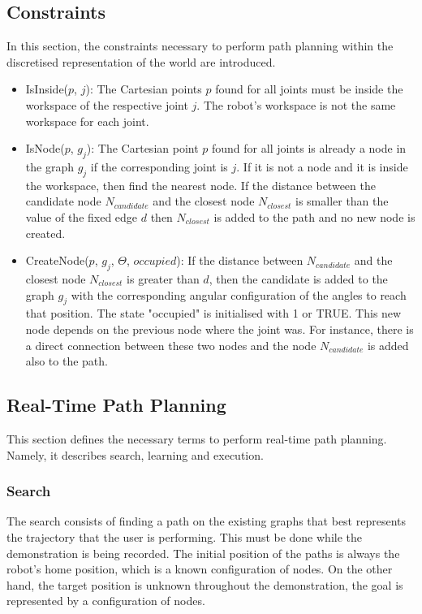 \documentclass[thesis]{mas_proposal}
\begin{document}
\subsection{Constraints}
	In this section, the constraints necessary to perform path planning within the discretised representation of the world are introduced.
	\begin{itemize}
		\item IsInside($p$, $j$): The Cartesian points $p$ found for all joints must be inside the workspace of the respective joint $j$. The robot's workspace is not the same workspace for each joint.
		\item IsNode($p$, $g_j$): The Cartesian point $p$ found for all joints is already a node in the graph $g_j$ if the corresponding joint is $j$. If it is not a node and it is inside the workspace, then find the nearest node. If the distance between the candidate node $N_{candidate}$ and the closest node $N_{closest}$ is smaller than the value of the fixed edge $d$ then $N_{closest}$ is added to the path and no new node is created.
		\item CreateNode($p$, $g_j$, $\Theta$, $occupied$): If the distance between $N_{candidate}$ and the closest node $N_{closest}$ is greater than $d$, then the candidate is added to the graph $g_j$ with the corresponding angular configuration of the angles to reach that position. The state "occupied" is initialised with 1 or TRUE. This new node depends on the previous node where the joint was. For instance, there is a direct connection between these two nodes and the node $N_{candidate}$ is added also to the path.
	\end{itemize} 
\subsection{Real-Time Path Planning}
	This section defines the necessary terms to perform real-time path planning. Namely, it describes search, learning and execution. 
	\subsubsection{Search}
		The search consists of finding a path on the existing graphs that best represents the trajectory that the user is performing. This must be done while the demonstration is being recorded. The initial position of the paths is always the robot's home position, which is a known configuration of nodes. On the other hand, the target position is unknown throughout the demonstration, the goal is represented by a configuration of nodes.	
\end{document}
